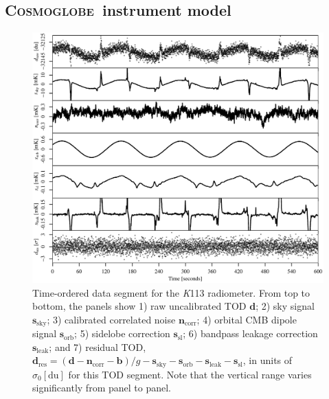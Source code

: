 \documentclass[twocolumn]{../../common/aa}
\newcommand{\cosmoglobe}{\textsc{Cosmoglobe}}
\newcommand{\K}[0]{\textit K}
\begin{document}
\subsection{\cosmoglobe\ instrument model}
\label{sec:wmap_instmodel}

\begin{figure}
	\includegraphics[width=\textwidth]{figures/K113_timestreams.pdf}
	\caption{Time-ordered data segment for the \K113 radiometer. From top to bottom, the panels show 1) raw uncalibrated TOD $\boldsymbol d$; 2) sky signal $\boldsymbol s_\mathrm{sky}$; 3) calibrated correlated noise $\boldsymbol n_\mathrm{corr}$; 4) orbital CMB dipole signal $\boldsymbol s_\mathrm{orb}$; 5) sidelobe correction $\boldsymbol s_\mathrm{sl}$; 6) bandpass leakage correction $\boldsymbol s_\mathrm{leak}$; and 7) residual TOD, $\boldsymbol d_\mathrm{res}=(\boldsymbol d -\boldsymbol n_\mathrm{corr}-\boldsymbol b)/g-\boldsymbol s_\mathrm{sky}-\boldsymbol s_\mathrm{orb}-\boldsymbol s_\mathrm{leak} -\boldsymbol s_\mathrm{sl}$, in units of $\sigma_0[\mathrm{du}]$ for this TOD segment. Note that the vertical range varies significantly from panel to panel.
		}
	\label{fig:timestreams}
\end{figure}
\end{document}
